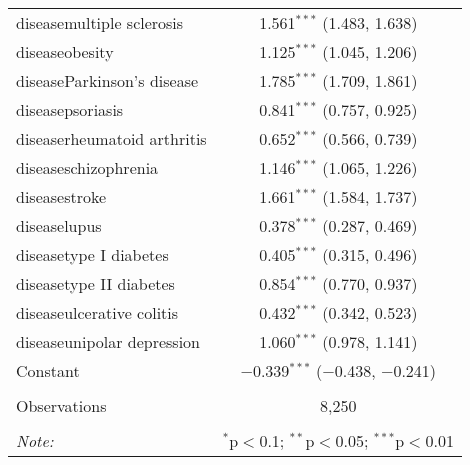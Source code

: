 \begin{table}[!htbp]
\begin{tabular}{@{\extracolsep{5pt}}lc}
  diseasemultiple sclerosis & 1.561$^{***}$ (1.483, 1.638) \\ 
  diseaseobesity & 1.125$^{***}$ (1.045, 1.206) \\ 
  diseaseParkinson's disease & 1.785$^{***}$ (1.709, 1.861) \\ 
  diseasepsoriasis & 0.841$^{***}$ (0.757, 0.925) \\ 
  diseaserheumatoid arthritis & 0.652$^{***}$ (0.566, 0.739) \\ 
  diseaseschizophrenia & 1.146$^{***}$ (1.065, 1.226) \\ 
  diseasestroke & 1.661$^{***}$ (1.584, 1.737) \\ 
  diseaselupus & 0.378$^{***}$ (0.287, 0.469) \\ 
  diseasetype I diabetes & 0.405$^{***}$ (0.315, 0.496) \\ 
  diseasetype II diabetes & 0.854$^{***}$ (0.770, 0.937) \\ 
  diseaseulcerative colitis & 0.432$^{***}$ (0.342, 0.523) \\ 
  diseaseunipolar depression & 1.060$^{***}$ (0.978, 1.141) \\ 
  Constant & $-$0.339$^{***}$ ($-$0.438, $-$0.241) \\ 
 \hline \\[-1.8ex] 
Observations & 8,250 \\ 
\hline 
\hline \\[-1.8ex] 
\textit{Note:}  & \multicolumn{1}{r}{$^{*}$p$<$0.1; $^{**}$p$<$0.05; $^{***}$p$<$0.01} \\ 
\end{tabular} 
\end{table} 
